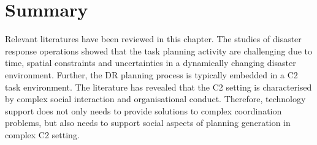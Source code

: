 

\section{Summary}
Relevant literatures have been reviewed in this chapter. The studies of disaster response operations showed that the task planning activity are challenging due to time, spatial constraints and uncertainties in a dynamically changing disaster environment. Further, the \ac{DR} planning process is typically embedded in a \acf{C2} task environment. The literature has revealed that the \ac{C2} setting is characterised by complex social interaction and organisational conduct. Therefore, technology support does not only needs to provide solutions to complex coordination problems, but also needs to support social aspects of planning generation in complex \ac{C2} setting. \\

